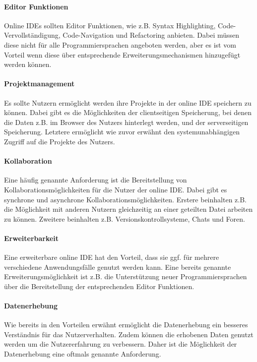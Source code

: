\paragraph{Editor Funktionen}
Online IDEs sollten Editor Funktionen, wie z.B. Syntax Highlighting, Code-Vervollständigung, Code-Navigation und Refactoring anbieten. Dabei müssen diese nicht für alle Programmiersprachen angeboten werden, aber es ist vom Vorteil wenn diese über entsprechende Erweiterungsmechanismen hinzugefügt werden können.

\paragraph{Projektmanagement}
Es sollte Nutzern ermöglicht werden ihre Projekte in der online IDE speichern zu können. Dabei gibt es die Möglichkeiten der clientseitigen Speicherung, bei denen die Daten z.B. im Browser des Nutzers hinterlegt werden, und der serverseitigen Speicherung. Letztere ermöglicht wie zuvor erwähnt den systemunabhängigen Zugriff auf die Projekte des Nutzers.

\paragraph{Kollaboration}
Eine häufig genannte Anforderung ist die Bereitstellung von Kollaborationsmöglichkeiten für die Nutzer der online IDE. Dabei gibt es synchrone und asynchrone Kollaborationsmöglichkeiten. Erstere beinhalten z.B. die Möglichkeit mit anderen Nutzern gleichzeitig an einer geteilten Datei arbeiten zu können. Zweitere beinhalten z.B. Versionskontrollsysteme, Chats und Foren.

\paragraph{Erweiterbarkeit}
Eine erweiterbare online IDE hat den Vorteil, dass sie ggf. für mehrere verschiedene Anwendungsfälle genutzt werden kann. Eine bereits genannte Erweiterungsmöglichkeit ist z.B. die Unterstützung neuer Programmiersprachen über die Bereitstellung der entsprechenden Editor Funktionen.


\paragraph{Datenerhebung}
Wie bereits in den Vorteilen erwähnt ermöglicht die Datenerhebung ein besseres Verständnis für das Nutzerverhalten. Zudem können die erhobenen Daten genutzt werden um die Nutzererfahrung zu verbessern. Daher ist die Möglichkeit der Datenerhebung eine oftmals genannte Anforderung.
